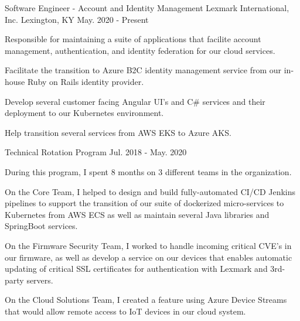 

\begin{cventries}

  \cventry
    {Software Engineer - Account and Identity Management} %
    {Lexmark International, Inc.} %
    {Lexington, KY} %
    {May. 2020 - Present} %
    {
      \begin{cvitems} %
        \item {Responsible for maintaining a suite of applications that facilite account management, authentication, and identity federation for our cloud services.}
        \item {Facilitate the transition to Azure B2C identity management service from our in-house Ruby on Rails identity provider.}
        \item {Develop several customer facing Angular UI's and C\# services and their deployment to our Kubernetes environment.}
        \item {Help transition several services from AWS EKS to Azure AKS.}
      \end{cvitems}
    }

  \cventry
    {Technical Rotation Program} %
    { } %
    { } %
    {Jul. 2018 - May. 2020} %
    {
      \begin{cvitems} %
        \item {During this program, I spent 8 months on 3 different teams in the organization.}
        \item {On the Core Team, I helped to design and build fully-automated CI/CD Jenkins pipelines to support the transition of our suite of dockerized micro-services to Kubernetes from AWS ECS as well as maintain several Java libraries and SpringBoot services.}
        \item {On the Firmware Security Team, I worked to handle incoming critical CVE's in our firmware, as well as develop a service on our devices that enables automatic updating of critical SSL certificates for authentication with Lexmark and 3rd-party servers.}
        \item {On the Cloud Solutions Team, I created a feature using Azure Device Streams that would allow remote access to IoT devices in our cloud system.}
      \end{cvitems}
    }


\end{cventries}
